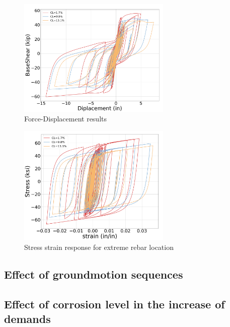 \begin{figure}[htbp]
	\centering
	\includegraphics[width=0.65\textwidth]{Chapter-5/figs/ForceDisplacement_01}
	\caption{Force-Displacement results}
	\label{fig:Force-Displacement_Results}
\end{figure}
\begin{figure}[htbp]
	\centering
	\includegraphics[width=0.65\textwidth]{Chapter-5/figs/Steel_StressStrain}
	\caption{Stress strain response for extreme rebar location}
	\label{fig:Steel_Stress_Strain_Response}
\end{figure}
\subsection{Effect of groundmotion sequences}

\subsection{Effect of corrosion level in the increase of demands}


